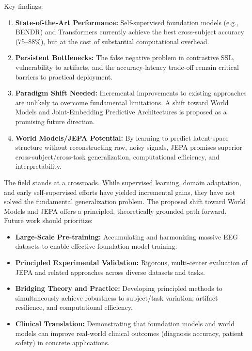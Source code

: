 \documentclass[11pt]{article}
\begin{document}
Key findings:

\begin{enumerate}
    \item \textbf{State-of-the-Art Performance:} Self-supervised foundation models (e.g., BENDR) and Transformers currently achieve the best cross-subject accuracy (75--88\%), but at the cost of substantial computational overhead.
    
    \item \textbf{Persistent Bottlenecks:} The false negative problem in contrastive SSL, vulnerability to artifacts, and the accuracy-latency trade-off remain critical barriers to practical deployment.
    
    \item \textbf{Paradigm Shift Needed:} Incremental improvements to existing approaches are unlikely to overcome fundamental limitations. A shift toward World Models and Joint-Embedding Predictive Architectures is proposed as a promising future direction.
    
    \item \textbf{World Models/JEPA Potential:} By learning to predict latent-space structure without reconstructing raw, noisy signals, JEPA promises superior cross-subject/cross-task generalization, computational efficiency, and interpretability.
\end{enumerate}

The field stands at a crossroads. While supervised learning, domain adaptation, and early self-supervised efforts have yielded incremental gains, they have not solved the fundamental generalization problem. The proposed shift toward World Models and JEPA offers a principled, theoretically grounded path forward. Future work should prioritize:

\begin{itemize}
    \item \textbf{Large-Scale Pre-training:} Accumulating and harmonizing massive EEG datasets to enable effective foundation model training.
    
    \item \textbf{Principled Experimental Validation:} Rigorous, multi-center evaluation of JEPA and related approaches across diverse datasets and tasks.
    
    \item \textbf{Bridging Theory and Practice:} Developing principled methods to simultaneously achieve robustness to subject/task variation, artifact resilience, and computational efficiency.
    
    \item \textbf{Clinical Translation:} Demonstrating that foundation models and world models can improve real-world clinical outcomes (diagnosis accuracy, patient safety) in concrete applications.
\end{itemize}
\end{document}
